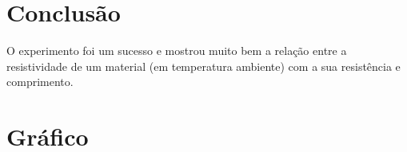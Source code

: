 \documentclass[14pt,twocolumn ]{article}
\begin{document}

\section{Conclusão}

O experimento foi um sucesso e mostrou muito bem a relação entre a resistividade de um material (em temperatura ambiente) com a sua resistência e comprimento.  




\section{Gráfico}


\begin{center}
    

\begin{minipage}{\textwidth}%
\label{visina8}%
\end{minipage}

\end{center}
\end{document}
